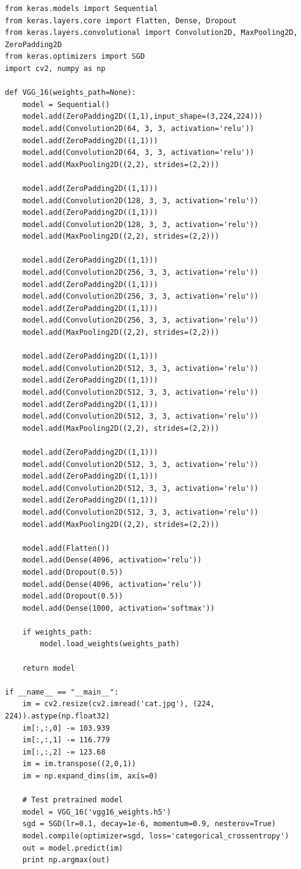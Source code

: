 \documentclass[12pt, a4paper, oneside, headinclude, footinclude]{article}
\begin{document}
\begin{verbatim}
from keras.models import Sequential
from keras.layers.core import Flatten, Dense, Dropout
from keras.layers.convolutional import Convolution2D, MaxPooling2D, ZeroPadding2D
from keras.optimizers import SGD
import cv2, numpy as np

def VGG_16(weights_path=None):
    model = Sequential()
    model.add(ZeroPadding2D((1,1),input_shape=(3,224,224)))
    model.add(Convolution2D(64, 3, 3, activation='relu'))
    model.add(ZeroPadding2D((1,1)))
    model.add(Convolution2D(64, 3, 3, activation='relu'))
    model.add(MaxPooling2D((2,2), strides=(2,2)))

    model.add(ZeroPadding2D((1,1)))
    model.add(Convolution2D(128, 3, 3, activation='relu'))
    model.add(ZeroPadding2D((1,1)))
    model.add(Convolution2D(128, 3, 3, activation='relu'))
    model.add(MaxPooling2D((2,2), strides=(2,2)))

    model.add(ZeroPadding2D((1,1)))
    model.add(Convolution2D(256, 3, 3, activation='relu'))
    model.add(ZeroPadding2D((1,1)))
    model.add(Convolution2D(256, 3, 3, activation='relu'))
    model.add(ZeroPadding2D((1,1)))
    model.add(Convolution2D(256, 3, 3, activation='relu'))
    model.add(MaxPooling2D((2,2), strides=(2,2)))

    model.add(ZeroPadding2D((1,1)))
    model.add(Convolution2D(512, 3, 3, activation='relu'))
    model.add(ZeroPadding2D((1,1)))
    model.add(Convolution2D(512, 3, 3, activation='relu'))
    model.add(ZeroPadding2D((1,1)))
    model.add(Convolution2D(512, 3, 3, activation='relu'))
    model.add(MaxPooling2D((2,2), strides=(2,2)))

    model.add(ZeroPadding2D((1,1)))
    model.add(Convolution2D(512, 3, 3, activation='relu'))
    model.add(ZeroPadding2D((1,1)))
    model.add(Convolution2D(512, 3, 3, activation='relu'))
    model.add(ZeroPadding2D((1,1)))
    model.add(Convolution2D(512, 3, 3, activation='relu'))
    model.add(MaxPooling2D((2,2), strides=(2,2)))

    model.add(Flatten())
    model.add(Dense(4096, activation='relu'))
    model.add(Dropout(0.5))
    model.add(Dense(4096, activation='relu'))
    model.add(Dropout(0.5))
    model.add(Dense(1000, activation='softmax'))

    if weights_path:
        model.load_weights(weights_path)

    return model

if __name__ == "__main__":
    im = cv2.resize(cv2.imread('cat.jpg'), (224, 224)).astype(np.float32)
    im[:,:,0] -= 103.939
    im[:,:,1] -= 116.779
    im[:,:,2] -= 123.68
    im = im.transpose((2,0,1))
    im = np.expand_dims(im, axis=0)

    # Test pretrained model
    model = VGG_16('vgg16_weights.h5')
    sgd = SGD(lr=0.1, decay=1e-6, momentum=0.9, nesterov=True)
    model.compile(optimizer=sgd, loss='categorical_crossentropy')
    out = model.predict(im)
    print np.argmax(out)
\end{verbatim}

\renewcommand{\refname}{\spacedlowsmallcaps{References}} 





\end{document}
